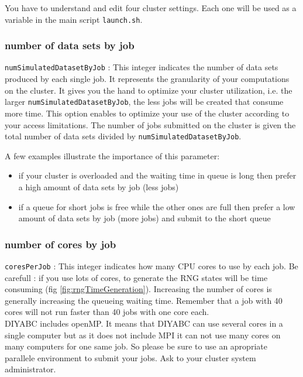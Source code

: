 You have to understand and edit four cluster settings. Each one will be used as a variable in the main script \texttt{launch.sh}.
 

\subsubsection{number of data sets by job}
\texttt{numSimulatedDatasetByJob} : This integer indicates the number of data sets produced by each single job. It represents the granularity of your computations on the cluster. It gives you the hand to optimize your cluster utilization, i.e. the larger \texttt{numSimulatedDatasetByJob}, the less jobs will be created that consume more time. This option enables to optimize your use of the cluster according to your access limitations. The number of jobs submitted on the cluster is given the total number of data sets divided by \texttt{numSimulatedDatasetByJob}. 

A few examples illustrate the importance of this parameter:
\begin{itemize}
 \item  if your cluster is overloaded and the waiting time in queue is long then prefer a high amount of data sets by job (less jobs)
 \item if a queue for short jobs is free while the other ones are full then prefer a low amount of data sets by job (more jobs) and submit to the short queue
\end{itemize}

\subsubsection{number of cores by job}
\texttt{coresPerJob} : This integer indicates how many CPU cores to use by each job. Be carefull : if you use lots of cores, to generate the RNG states will be time consuming (fig \ref{fig:rngTimeGeneration}). Increasing the number of cores is generally increasing the queueing waiting time. Remember that a job with 40 cores will not run faster than 40 jobs with one core each. \\
DIYABC includes openMP. It means that DIYABC can use several cores in a single computer but as it does not include MPI it can not use many cores on many computers for one same job. So please be sure to use an apropriate parallele environment to submit your jobs. Ask to your cluster system administrator. 

